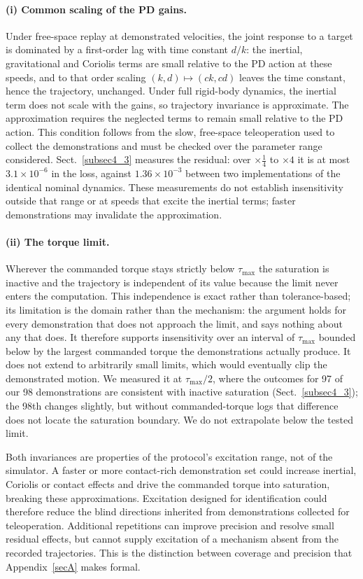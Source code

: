 \documentclass[pdflatex,iicol,sn-apa]{sn-jnl}
\theoremstyle{remark}
\begin{document}
\paragraph{(i) Common scaling of the PD gains.}
Under free-space replay at demonstrated velocities, the joint response to a target is dominated by a
first-order lag with time constant $d/k$: the inertial, gravitational and Coriolis terms are small
relative to the PD action at these speeds, and to that order scaling $(k, d) \mapsto (ck, cd)$ leaves
the time constant, hence the trajectory, unchanged. Under full rigid-body dynamics, the inertial term does not scale with the gains, so trajectory
invariance is approximate. The approximation requires the neglected terms to remain small relative
to the PD action. This condition follows from the slow, free-space teleoperation used to collect
the demonstrations and must be checked over the parameter range considered. Sect.~\ref{subsec4_3} measures the residual: over
$\times \tfrac14$ to $\times 4$ it is at most $3.1\times10^{-6}$ in the loss, against $1.36\times10^{-3}$ between
two implementations of the identical nominal dynamics. These measurements do not establish insensitivity outside that range or at speeds that
excite the inertial terms; faster demonstrations may invalidate the approximation.

\paragraph{(ii) The torque limit.}
Wherever the commanded torque stays strictly below $\tau_{\max}$ the saturation is inactive and the
trajectory is independent of its value because the limit never enters the computation. This independence
is exact rather than tolerance-based; its limitation is the domain rather
than the mechanism: the argument holds for every demonstration that does not approach the limit, and
says nothing about any that does. It therefore supports insensitivity over an interval of
$\tau_{\max}$ bounded below by the largest commanded torque the demonstrations actually produce.
It does not extend to arbitrarily small limits, which would eventually clip the demonstrated motion. We
measured it at $\tau_{\max}/2$, where the outcomes for 97 of our 98 demonstrations are consistent with inactive saturation
(Sect.~\ref{subsec4_3}); the 98th changes slightly, but without commanded-torque logs that difference does not locate
the saturation boundary. We do not extrapolate below the tested limit.

Both invariances are properties of the protocol's excitation range, not of the simulator. A
faster or more contact-rich demonstration set could increase inertial, Coriolis or contact effects
and drive the commanded torque into saturation, breaking these approximations. Excitation designed for identification could therefore reduce the blind directions inherited
from demonstrations collected for teleoperation. Additional repetitions can improve precision and resolve small residual effects, but
cannot supply excitation of a mechanism absent from the recorded trajectories. This is the
distinction between coverage and precision that Appendix~\ref{secA} makes formal.
\end{document}
